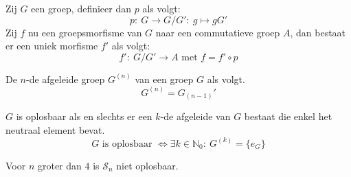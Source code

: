 \documentclass[main.tex]{subfiles}
\begin{document}
\begin{st}
Zij $G$ een groep, definieer dan $p$ als volgt:
\[ p:\ G \rightarrow G/G':\ g \mapsto gG' \]
Zij $f$ nu een groepsmorfisme van $G$ naar een commutatieve groep $A$, dan bestaat er een uniek morfisme $f'$ als volgt:
\[ f':\ G/G' \rightarrow A \text{ met } f = f'\circ p \]
\end{st}

\begin{de}
De $n$-de afgeleide groep $G^{(n)}$ van een groep $G$ als volgt.
\[ G^{(n)} = G_{(n-1)}' \]
\end{de}

\begin{pr}
$G$ is oplosbaar als en slechts er een $k$-de afgeleide van $G$ bestaat die enkel het neutraal element bevat.
\[ G \text{ is oplosbaar } \Leftrightarrow \exists k\in\mathbb{N}_{0}:\ G^{(k)} = \{e_{G}\} \]
\end{pr}

\begin{st}
Voor $n$ groter dan $4$ is $\mathcal{S}_{n}$ niet oplosbaar.
\end{st}
\end{document}
